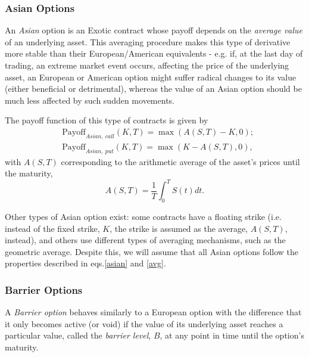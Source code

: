 \subsubsection{Asian Options}
An \emph{Asian} option is an Exotic contract whose payoff depends on the \emph{average value} of an underlying asset. This averaging procedure makes this type of derivative more stable than their European/American equivalents - e.g. if, at the last day of trading, an extreme market event occurs, affecting the price of the underlying asset, an European or American option might suffer radical changes to its value (either beneficial or detrimental), whereas the value of an Asian option should be much less affected by such sudden movements.

The payoff function of this type of contracts is given by
\begin{equation}\label{asian}
\begin{split}
&\text{Payoff}_{Asian,\ call}(K,T)=\max\left(A(S,T)-K,0\right);\\
&\text{Payoff}_{Asian,\ put}(K,T)=\max\left(K-A(S,T),0\right),
\end{split}
\end{equation}
\noindent with $A(S,T)$ corresponding to the arithmetic average of the asset's prices until the maturity,
\begin{equation}\label{avg}
A(S,T)=\frac{1}{T}\int_0^TS(t)dt.
\end{equation}

Other types of Asian option exist: some contracts have a floating strike (i.e. instead of the fixed strike, $K$, the strike is assumed as the average, $A(S,T)$, instead), and others use different types of averaging mechanisms, such as the geometric average. Despite this, we will assume that all Asian options follow the properties described in eqs.\eqref{asian} and \eqref{avg}.


\subsubsection{Barrier Options}
A \emph{Barrier option} behaves similarly to a European option with the difference that it only becomes active (or void) if the value of its underlying asset reaches a particular value, called the \emph{barrier level}, $B$, at any point in time until the option's maturity.

